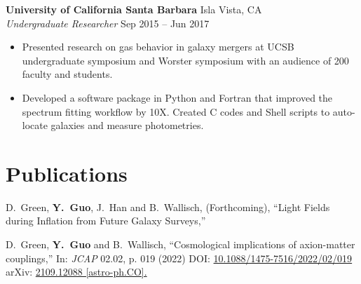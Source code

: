 \documentclass[letterpaper,12pt]{article}
\newenvironment{zitemize}{
\begin{itemize} \vspace{-.9em}\itemsep 0pt \parskip 0pt}
{\end{itemize}\vspace{-.5em}}
\newcommand{\proglang}[1]{#1}
\begin{document}
\textbf{University of California Santa Barbara} \hfill Isla Vista, CA \\
\textit{Undergraduate Researcher} \hfill Sep 2015 -- Jun 2017 \\
\begin{zitemize}
    \item Presented research on gas behavior in galaxy mergers at UCSB undergraduate symposium and Worster symposium with an audience of 200 faculty and students.
    \item Developed a software package in \proglang{Python} and \proglang{Fortran} that improved the spectrum fitting workflow by 10X. Created \proglang{C} codes and \proglang{Shell} scripts to auto-locate galaxies and measure photometries.
\end{zitemize}


\section{Publications}

D.~Green, \textbf{Y.~Guo}, J.~Han and B.~Wallisch, (Forthcoming),
``Light Fields during Inflation from Future Galaxy Surveys,''

D.~Green, \textbf{Y.~Guo} and B.~Wallisch,
``Cosmological implications of axion-matter couplings,''
In: \textit{JCAP} 02.02, p. 019 (2022)
DOI: \href{https://iopscience.iop.org/article/10.1088/1475-7516/2022/02/019}{10.1088/1475-7516/2022/02/019}
arXiv: \href{https://arxiv.org/abs/2109.12088?context=hep-ph}{2109.12088 [astro-ph.CO].}
\end{document}
